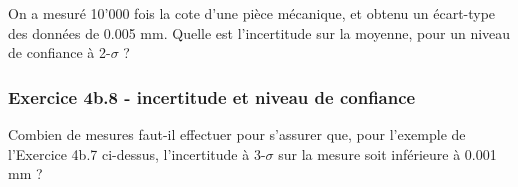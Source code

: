 \documentclass[main.tex]{subfiles}
\begin{document}
On a mesuré 10'000 fois la cote d'une pièce mécanique, et obtenu un écart-type des données de 0.005 mm. Quelle est l'incertitude sur la moyenne, pour un niveau de confiance à 2-$\sigma$ ?

\subsubsection*{Exercice 4b.8 - incertitude et niveau de confiance}

Combien de mesures faut-il effectuer pour s'assurer que, pour l'exemple de l'Exercice 4b.7 ci-dessus, l'incertitude à 3-$\sigma$ sur la mesure soit inférieure à 0.001 mm ?

\fi
\end{document}
